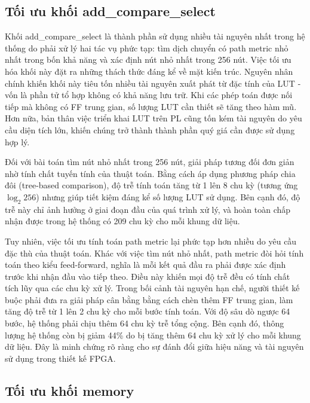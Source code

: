 \documentclass[../DoAn.tex]{subfiles}
\begin{document}
\subsection{Tối ưu khối add\_compare\_select}
\label{section:Tối ưu khối add_compare_select}

Khối add\_compare\_select là thành phần sử dụng nhiều tài nguyên nhất trong hệ thống do phải xử lý hai tác vụ phức tạp: tìm dịch chuyển có path metric nhỏ nhất trong bốn khả năng và xác định nút nhỏ nhất trong 256 nút. Việc tối ưu hóa khối này đặt ra những thách thức đáng kể về mặt kiến trúc. Nguyên nhân chính khiến khối này tiêu tốn nhiều tài nguyên xuất phát từ đặc tính của LUT - vốn là phần tử tổ hợp không có khả năng lưu trữ. Khi các phép toán được nối tiếp mà không có FF trung gian, số lượng LUT cần thiết sẽ tăng theo hàm mũ. Hơn nữa, bản thân việc triển khai LUT trên PL cũng tốn kém tài nguyên do yêu cầu diện tích lớn, khiến chúng trở thành thành phần quý giá cần được sử dụng hợp lý.

Đối với bài toán tìm nút nhỏ nhất trong 256 nút, giải pháp tương đối đơn giản nhờ tính chất tuyến tính của thuật toán. Bằng cách áp dụng phương pháp chia đôi (tree-based comparison), độ trễ tính toán tăng từ 1 lên 8 chu kỳ (tương ứng $\log_{2} 256$) nhưng giúp tiết kiệm đáng kể số lượng LUT sử dụng. Bên cạnh đó, độ trễ này chỉ ảnh hưởng ở giai đoạn đầu của quá trình xử lý, và hoàn toàn chấp nhận được trong hệ thống có 209 chu kỳ cho mỗi khung dữ liệu.

Tuy nhiên, việc tối ưu tính toán path metric lại phức tạp hơn nhiều do yêu cầu đặc thù của thuật toán. Khác với việc tìm nút nhỏ nhất, path metric đòi hỏi tính toán theo kiểu feed-forward, nghĩa là mỗi kết quả đầu ra phải được xác định trước khi nhận đầu vào tiếp theo. Điều này khiến mọi độ trễ đều có tính chất tích lũy qua các chu kỳ xử lý. Trong bối cảnh tài nguyên hạn chế, người thiết kế buộc phải đưa ra giải pháp cân bằng bằng cách chèn thêm FF trung gian, làm tăng độ trễ từ 1 lên 2 chu kỳ cho mỗi bước tính toán. Với độ sâu dò ngược 64 bước, hệ thống phải chịu thêm 64 chu kỳ trễ tổng cộng. Bên cạnh đó, thông lượng hệ thống còn bị giảm 44\% do bị tăng thêm 64 chu kỳ xử lý cho mỗi khung dữ liệu. Đây là minh chứng rõ ràng cho sự đánh đổi giữa hiệu năng và tài nguyên sử dụng trong thiết kế FPGA.

\subsection{Tối ưu khối memory}
\label{section:Tối ưu khối memory}
\end{document}
